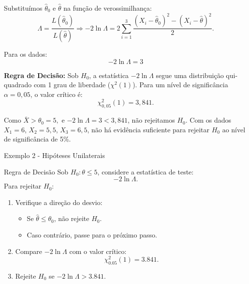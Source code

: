\documentclass[12pt]{beamer}
\begin{document}
\begin{frame}
	\begin{block}{}
Substituímos \(\hat{\theta}_0\) e \(\hat{\theta}\) na função de verossimilhança:
			\[
			\Lambda = \frac{L(\hat{\theta}_0)}{L(\hat{\theta})}\Rightarrow 
			-2 \ln \Lambda = 2 \sum_{i=1}^3 \frac{(X_i - \hat{\theta}_0)^2 - (X_i - \hat{\theta})^2}{2}.
			\]
			
			Para os dados:
			\[
			-2 \ln \Lambda = 3
			\]

	\end{block}
\end{frame}

\begin{frame}
	\begin{block}{}
		\justifying
\textbf{Regra de Decisão:} Sob \(H_0\), a estatística \(-2 \ln \Lambda\) segue uma distribuição qui-quadrado com 1 grau de liberdade (\(\chi^2(1)\)). Para um nível de significância \(\alpha = 0,05\), o valor crítico é:
			\[
			\chi^2_{0,05}(1) = 3,841.
			\]
			
			Como $\bar{X}>\theta_{0}=5,$ e \(-2 \ln \Lambda = 3 < 3,841\), não rejeitamos \(H_0\). Com os dados \(X_1 = 6\), \(X_2 = 5,5\), \(X_3 = 6,5\), não há evidência suficiente para rejeitar \(H_0\) ao nível de significância de 5\%.	
	\end{block}
\end{frame}

\begin{frame}{Exemplo 2 - Hipóteses Unilaterais}
	\begin{block}{Regra de Decisão}
		\justifying
		Sob \(H_0: \theta \leq 5\), considere a estatística de teste:
		\[
		-2 \ln \Lambda.
		\]
		Para rejeitar \(H_0\):
		\begin{enumerate}
			\item Verifique a direção do desvio:
			\begin{itemize}
				\item Se \(\hat{\theta} \leq \theta_0\), não rejeite \(H_0\).
				\item Caso contrário, passe para o próximo passo.
			\end{itemize}
			\item Compare \(-2 \ln \Lambda\) com o valor crítico:
			\[
			\chi^2_{0.05}(1) = 3.841.
			\]
			\item Rejeite \(H_0\) se \(-2 \ln \Lambda > 3.841\).
		\end{enumerate}
	\end{block}
\end{frame}
\end{document}
